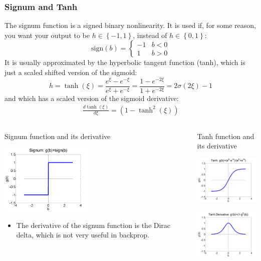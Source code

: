 \documentclass{beamer}
\begin{document}
\begin{frame}
  \frametitle{Signum and Tanh}

  The signum function is a signed binary nonlinearity.  It is used if,
  for some reason, you want your output to be
  $h\in\left\{-1,1\right\}$, instead of $h\in\left\{0,1\right\}$:
  \[
  \mbox{sign}(b)=\begin{cases}
  -1 & b<0\\
  1 & b>0
  \end{cases}
  \]
  It is usually approximated by the hyperbolic tangent function
  (tanh), which is just a scaled shifted version of the sigmoid:
  \begin{displaymath}
    h=\tanh(\xi) = \frac{e^\xi-e^{-\xi}}{e^\xi+e^{-\xi}}
    = \frac{1-e^{-2\xi}}{1+e^{-2\xi}}
    = 2\sigma(2\xi)-1
  \end{displaymath}
  and which has a scaled version of the sigmoid derivative:
  \begin{align*}
    \frac{d\tanh(\xi)}{d\xi} =\left(1-\tanh^2(\xi)\right)
  \end{align*}
\end{frame}

\begin{frame}
  \begin{columns}[t]
    \column{2.25in}
    \begin{block}{Signum function and its derivative}
      \centerline{\includegraphics[width=1.75in]{figs/nn_signum.png}}
      \begin{itemize}
      \item The derivative of the signum function is the Dirac
        delta, which is not very useful in backprop.
      \end{itemize}
    \end{block}
    \column{2.25in}
    \begin{block}{Tanh function and its derivative}
      \centerline{\includegraphics[width=1.75in]{figs/nn_tanh.png}}
      \centerline{\includegraphics[width=1.75in]{figs/nn_tanhprime.png}}
    \end{block}
  \end{columns}
\end{frame}
\end{document}
